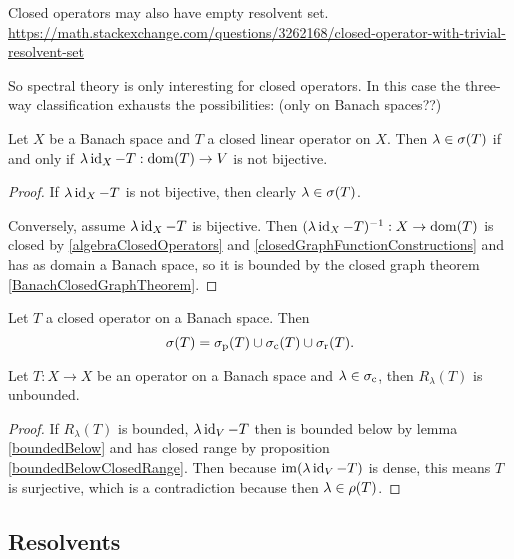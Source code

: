 \begin{example}
Closed operators may also have empty resolvent set. \url{https://math.stackexchange.com/questions/3262168/closed-operator-with-trivial-resolvent-set}
\end{example}

So spectral theory is only interesting for closed operators. In this case the three-way classification exhausts the possibilities: (only on Banach spaces??)

\begin{proposition} \label{closedOperatorBanachSpaceSpectrumCriterion}
Let $X$ be a Banach space and $T$ a closed linear operator on $X$. Then $\lambda \in \sigma(T)$ \textup{if and only if} $\lambda \operatorname{id}_X - T: \operatorname{dom}(T) \to V$ is not bijective.
\end{proposition}
\begin{proof}
If $\lambda \operatorname{id}_X - T$ is not bijective, then clearly $\lambda \in \sigma(T)$.

Conversely, assume $\lambda \operatorname{id}_X - T$ is bijective. Then $(\lambda \operatorname{id}_X - T)^{-1}: X\to \operatorname{dom}(T)$ is closed by \ref{algebraClosedOperators} and \ref{closedGraphFunctionConstructions} and has as domain a Banach space, so it is bounded by the closed graph theorem \ref{BanachClosedGraphTheorem}.
\end{proof}
\begin{corollary} \label{spectrumDecomposition}
Let $T$ a closed operator on a Banach space. Then
\[ \sigma(T) = \sigma_\text{p}(T) \cup \sigma_\text{c}(T) \cup \sigma_\text{r}(T). \]
\end{corollary}


\begin{proposition}
Let $T:X\to X$ be an operator on a Banach space and $\lambda\in\sigma_\text{c}$, then $R_\lambda(T)$ is unbounded.
\end{proposition}
\begin{proof}
If $R_\lambda(T)$ is bounded, $\lambda \operatorname{id}_V - T$ then is bounded below by lemma \ref{boundedBelow} and has closed range by proposition \ref{boundedBelowClosedRange}. Then because $\operatorname{im}(\lambda \operatorname{id}_V - T)$ is dense, this means $T$ is surjective, which is a contradiction because then $\lambda\in\rho(T)$.
\end{proof}

\subsection{Resolvents}

